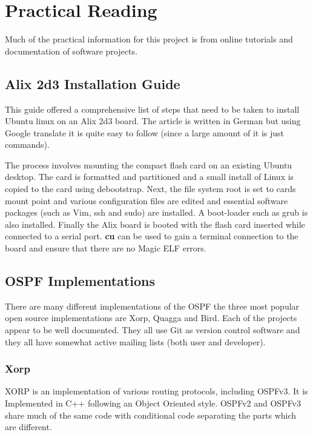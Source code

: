 \documentclass[12pt]{report}
\begin{document}

\section{Practical Reading}		
Much of the practical information for this project is from online tutorials and
documentation of software projects.  

\subsection{Alix 2d3 Installation Guide}
This guide offered a comprehensive list of steps that need to be taken
to install Ubuntu linux on an Alix 2d3 board.  The article is written in
German but using Google translate it is quite easy to follow (since a
large amount of it is just commands).  

The process involves mounting the compact flash card on an existing Ubuntu
desktop.  The card is formatted and partitioned and a small install of Linux is
copied to the card using debootstrap.  Next, the file system root is set to
cards mount point and various configuration files are edited and essential
software packages (such as Vim, ssh and sudo) are installed. A boot-loader such
as grub is also installed.  Finally the Alix board is booted with the flash card
inserted while connected to a serial port.  {\bf cu} can be used to gain a
terminal connection to the board and ensure that there are no Magic ELF errors.

\subsection{OSPF Implementations}
There are many different implementations of the OSPF the three most popular open
source implementations are Xorp, Quagga and Bird. Each of the projects appear to 
be well documented. They all use Git as version control software and they all 
have somewhat active mailing lists (both user and developer).

\subsubsection{Xorp}
XORP is an implementation of various routing protocols, including
OSPFv3. It is Implemented in C++ following an Object Oriented style.
OSPFv2 and OSPFv3 share much of the same code with conditional code
separating the parts which are different.
\end{document}
